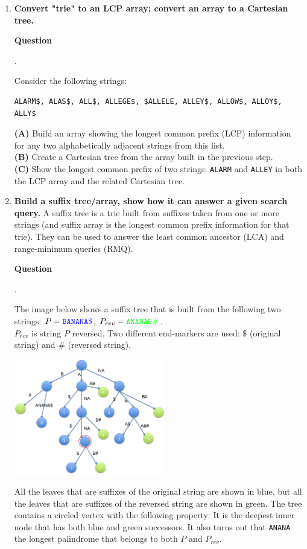 \documentclass[a4paper,12pt]{article}
\newcounter{mcounter}
\newcommand\showmcounter{\addtocounter{mcounter}{1}\themcounter}
\begin{document}
{\begin{enumerate}[label=4.\Alph*.]
\item {\bf Convert "trie" to an LCP array; convert an array to a Cartesian tree.}

\vspace{10pt}
{\bf Question \showmcounter.}
Consider the following strings: 
\begin{verbatim}
ALARM$, ALAS$, ALL$, ALLEGE$, $ALLELE, ALLEY$, ALLOW$, ALLOY$, ALLY$
\end{verbatim}

{\bf (A)} Build an array showing the longest common prefix (LCP) information for any two alphabetically adjacent
strings from this list.\\
{\bf (B)} Create a Cartesian tree from the array built in the previous step.\\
{\bf (C)} Show the longest common prefix of two strings: {\tt ALARM} and {\tt ALLEY} 
in both the LCP array and the related Cartesian tree. 


\item {\bf Build a suffix tree/array, show how it can answer a given search query.}
A suffix tree is a trie built from suffixes taken from one or more strings
(and suffix array is the longest common prefix information for that trie). 
They can be used to answer the least common ancestor (LCA) and range-minimum queries (RMQ).


\vspace{10pt}
{\bf Question \showmcounter.}
The image below shows a suffix tree that is built from the following two strings:
$P = \textcolor{blue}{\mathtt{BANANA\$}}$, 
$P_{rev} = \textcolor{green}{\mathtt{ANANAB\#}}$.\\
$P_{rev}$ is string $P$ reversed. Two different end-markers are used:
$\texttt{\$}$ (original string) and $\texttt{\#}$ (reversed string). 

\begin{center}
\includegraphics[width=2.6in]{ds-exam3/banana-suffix-tree.png}
\end{center}

All the leaves that are suffixes of the original string are shown in blue, but all 
the leaves that are suffixes of the reversed string are shown in green. 
The tree contains a circled vertex with the following property: It is the deepest inner 
node that has both blue and green successors.
It also turns out that {\tt ANANA} the longest palindrome 
that belongs to both $P$ and $P_{rev}$. 


\end{enumerate}}
\end{document}
